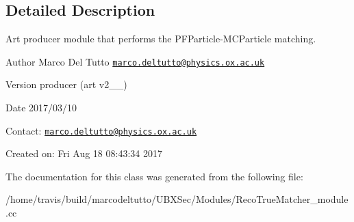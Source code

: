 \subsection{Detailed Description}
Art producer module that performs the P\-F\-Particle-\/\-M\-C\-Particle matching. 

\begin{DoxyAuthor}{Author}
Marco Del Tutto \href{mailto:marco.deltutto@physics.ox.ac.uk}{\tt marco.\-deltutto@physics.\-ox.\-ac.\-uk}
\end{DoxyAuthor}
\begin{DoxyVersion}{Version}
producer (art v2\-\_\-\_)
\end{DoxyVersion}
\begin{DoxyDate}{Date}
2017/03/10
\end{DoxyDate}
Contact\-: \href{mailto:marco.deltutto@physics.ox.ac.uk}{\tt marco.\-deltutto@physics.\-ox.\-ac.\-uk}

Created on\-: Fri Aug 18 08\-:43\-:34 2017 

The documentation for this class was generated from the following file\-:\begin{DoxyCompactItemize}
\item 
/home/travis/build/marcodeltutto/\-U\-B\-X\-Sec/\-Modules/Reco\-True\-Matcher\-\_\-module.\-cc\end{DoxyCompactItemize}
